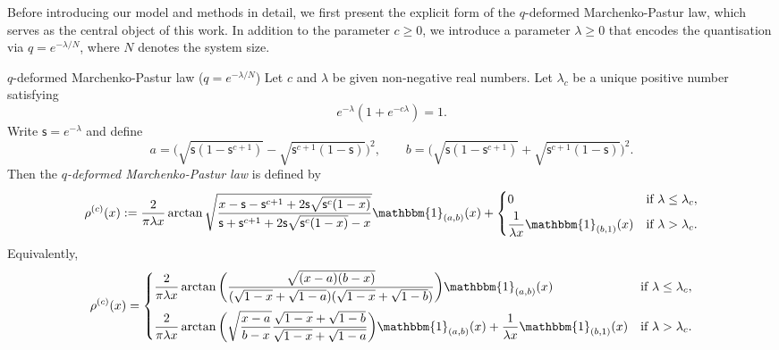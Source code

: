 \documentclass{amsart}
\theoremstyle{plain}
\theoremstyle{remark}
\numberwithin{equation}{section}
\begin{document}
Before introducing our model and methods in detail, we first present the explicit form of the $q$-deformed Marchenko-Pastur law, which serves as the central object of this work. In addition to the parameter $c \ge 0$, we introduce a parameter $\lambda \ge 0$ that encodes the quantisation via $q = e^{-\lambda/N}$, where $N$ denotes the system size. 

\begin{defn}{$q$-deformed Marchenko-Pastur law ($q=e^{-\lambda/N}$)} 
Let $c$ and $\lambda$ be given non-negative real numbers. Let $\lambda_c$ be a unique positive number satisfying
    \begin{equation} \label{eqn:def of lambdac}
        e^{-\lambda}( 1+e^{-c\lambda} )=1.
    \end{equation} 
Write $\mathsf{s}=e^{-\lambda}$ and define 
\begin{equation} \label{def of endpts a and b}
a=\Big(\sqrt{ \mathsf{s}(1-\mathsf{s}^{c+1}) } -\sqrt{ \mathsf{s}^{c+1}(1-\mathsf{s}) } \Big)^2, \qquad b=\Big(\sqrt{ \mathsf{s}(1-\mathsf{s}^{c+1}) } +\sqrt{ \mathsf{s}^{c+1}(1-\mathsf{s}) } \Big)^2. 
\end{equation}  
Then the \textit{$q$-deformed Marchenko-Pastur law} is defined by
\begin{equation}\label{eqn:def of limiting density v0}
            \rho^{(c)}(x) :=\frac{2}{\pi\lambda x}\arctan\sqrt{  \frac{ x- \mathsf{s} -\mathsf{s}^{c+1} +2\mathsf{s}  \sqrt{\mathsf{s}^{c}(1-x)}  }{ \mathsf{s} +\mathsf{s}^{c+1} +2 \mathsf{s}  \sqrt{\mathsf{s}^{c}(1-x)} -x  }    }\mathbbm{1}_{(a,b)}(x) +\begin{cases}
                0& \textup{if } \lambda \leq \lambda_c , \smallskip \\
                \displaystyle\frac{1}{\lambda x}\mathbbm{1}_{(b,1)}(x) & \textup{if } \lambda > \lambda_c. 
            \end{cases} 
    \end{equation}
Equivalently,  
\begin{equation} \label{eqn:def of limiting density}
   \rho^{(c)}(x) = 
  \begin{cases}
 \displaystyle  \frac{2}{\pi\lambda x}\arctan \bigg(  \frac{ \sqrt{(x-a)(b-x)}  }{ ( \sqrt{1-x}+\sqrt{1-a} )(\sqrt{1-x}+\sqrt{1-b}) } \bigg)  \mathbbm{1}_{(a,b)}(x)&\textup{if } \lambda\le \lambda_c, 
 \medskip 
 \\
 \displaystyle \frac{2}{\pi\lambda x}\arctan \bigg(  \sqrt{ \frac{x-a }{b-x} } \frac{\sqrt{1-x}+\sqrt{1-b} }{ \sqrt{1-x}+\sqrt{1-a} }  \bigg)  \mathbbm{1}_{(a,b)}(x) + \frac{1}{\lambda x}\mathbbm{1}_{(b,1)}(x)   &\textup{if } \lambda>\lambda_c. 
  \end{cases}  
\end{equation}   
\end{defn}
 
\end{document}
